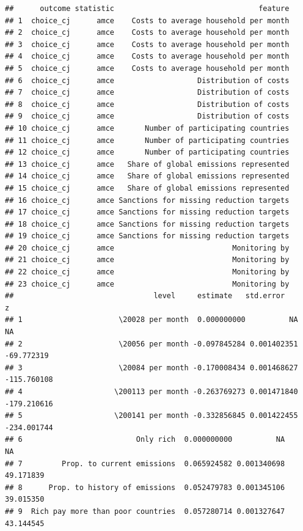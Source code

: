 \documentclass[a4paper,12pt]{article}\usepackage[]{graphicx}\usepackage[]{color}
\makeatletter
\newenvironment{kframe}{%
 \def\at@end@of@kframe{}%
 \ifinner\ifhmode%
  \def\at@end@of@kframe{\end{minipage}}%
  \begin{minipage}{\columnwidth}%
 \fi\fi%
 \def\FrameCommand##1{\hskip\@totalleftmargin \hskip-\fboxsep
 \colorbox{shadecolor}{##1}\hskip-\fboxsep
     \hskip-\linewidth \hskip-\@totalleftmargin \hskip\columnwidth}%
 \MakeFramed {\advance\hsize-\width
   \@totalleftmargin\z@ \linewidth\hsize
   \@setminipage}}%
 {\par\unskip\endMakeFramed%
 \at@end@of@kframe}
\newenvironment{knitrout}{}{} %
\makeatother
\begin{document}
\begin{knitrout}
\color{fgcolor}\begin{kframe}
\begin{verbatim}
##      outcome statistic                                 feature
## 1  choice_cj      amce    Costs to average household per month
## 2  choice_cj      amce    Costs to average household per month
## 3  choice_cj      amce    Costs to average household per month
## 4  choice_cj      amce    Costs to average household per month
## 5  choice_cj      amce    Costs to average household per month
## 6  choice_cj      amce                   Distribution of costs
## 7  choice_cj      amce                   Distribution of costs
## 8  choice_cj      amce                   Distribution of costs
## 9  choice_cj      amce                   Distribution of costs
## 10 choice_cj      amce       Number of participating countries
## 11 choice_cj      amce       Number of participating countries
## 12 choice_cj      amce       Number of participating countries
## 13 choice_cj      amce   Share of global emissions represented
## 14 choice_cj      amce   Share of global emissions represented
## 15 choice_cj      amce   Share of global emissions represented
## 16 choice_cj      amce Sanctions for missing reduction targets
## 17 choice_cj      amce Sanctions for missing reduction targets
## 18 choice_cj      amce Sanctions for missing reduction targets
## 19 choice_cj      amce Sanctions for missing reduction targets
## 20 choice_cj      amce                           Monitoring by
## 21 choice_cj      amce                           Monitoring by
## 22 choice_cj      amce                           Monitoring by
## 23 choice_cj      amce                           Monitoring by
##                                level     estimate   std.error           z
## 1                      \20028 per month  0.000000000          NA          NA
## 2                      \20056 per month -0.097845284 0.001402351  -69.772319
## 3                      \20084 per month -0.170008434 0.001468627 -115.760108
## 4                     \200113 per month -0.263769273 0.001471840 -179.210616
## 5                     \200141 per month -0.332856845 0.001422455 -234.001744
## 6                          Only rich  0.000000000          NA          NA
## 7         Prop. to current emissions  0.065924582 0.001340698   49.171839
## 8      Prop. to history of emissions  0.052479783 0.001345106   39.015350
## 9  Rich pay more than poor countries  0.057280714 0.001327647   43.144545

\end{verbatim}
\end{kframe}
\end{knitrout}
\end{document}
